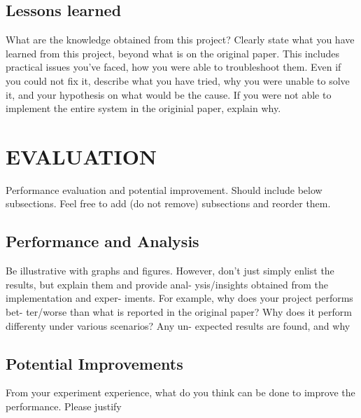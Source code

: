 \documentclass{acm_proc_article-sp}
\begin{document}
\subsection{Lessons learned}
What are the knowledge obtained from this project? Clearly
state what you have learned from this project, beyond what
is on the original paper. This includes practical issues you’ve
faced, how you were able to troubleshoot them.  Even if you
could not fix it, describe what you have tried, why you were
unable to solve it, and your hypothesis on what would be the
cause.  If you were not able to implement the entire system
in the originial paper, explain why.

\section{EVALUATION} \label{evaluation}
Performance evaluation and potential improvement.  Should
include below subsections.  Feel free to add (do not remove)
subsections and reorder them.

\subsection{Performance and Analysis}
Be illustrative with graphs and figures.  However, don’t just
simply enlist the results, but explain them and provide anal-
ysis/insights obtained from the implementation and exper-
iments.  For example, why does your project performs bet-
ter/worse than what is reported in the original paper?  Why
does it perform differenty under various scenarios?  Any un-
expected results are found, and why

\subsection{Potential Improvements}
From  your  experiment  experience,  what  do  you  think  can
be done to improve the performance.  Please justify

%

%
%
\end{document}
